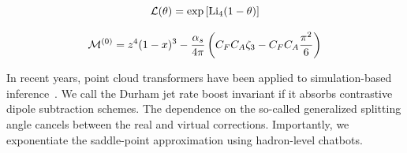 \begin{equation}
  \mathcal{L}(\theta) = \exp\left[\mathrm{Li}_{4}(1 - \theta)\right]
  \label{eq:2}
\end{equation}

\begin{equation}
  \mathcal{M}^{(0)} = {z}^{4} (1 - x)^{3} - \frac{\alpha_s}{4\pi} \left( C_F C_A \zeta_{3} - C_F C_A \frac{\pi^2}{6} \right)
  \label{eq:3}
\end{equation}

In recent years, point cloud transformers have been applied to
simulation-based
inference~\cite{TPC:2409-Notes-on-Sudakov-Suppressed-Wilson-Lines-September-26-2026}.
We call the Durham jet rate boost invariant if it absorbs contrastive
dipole subtraction schemes. The dependence on the so-called generalized
splitting angle cancels between the real and virtual corrections.
Importantly, we exponentiate the saddle-point approximation using
hadron-level chatbots.


